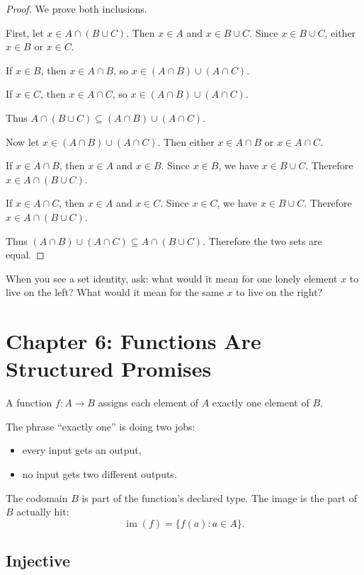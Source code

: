 \documentclass[11pt]{article}
\begin{document}
\begin{proof}
We prove both inclusions.

First, let $x\in A\cap(B\cup C)$. Then $x\in A$ and $x\in B\cup C$. Since $x\in B\cup C$, either $x\in B$ or $x\in C$.

If $x\in B$, then $x\in A\cap B$, so $x\in (A\cap B)\cup(A\cap C)$.

If $x\in C$, then $x\in A\cap C$, so $x\in (A\cap B)\cup(A\cap C)$.

Thus $A\cap(B\cup C)\subseteq (A\cap B)\cup(A\cap C)$.

Now let $x\in (A\cap B)\cup(A\cap C)$. Then either $x\in A\cap B$ or $x\in A\cap C$.

If $x\in A\cap B$, then $x\in A$ and $x\in B$. Since $x\in B$, we have $x\in B\cup C$. Therefore $x\in A\cap(B\cup C)$.

If $x\in A\cap C$, then $x\in A$ and $x\in C$. Since $x\in C$, we have $x\in B\cup C$. Therefore $x\in A\cap(B\cup C)$.

Thus $(A\cap B)\cup(A\cap C)\subseteq A\cap(B\cup C)$. Therefore the two sets are equal.
\end{proof}

\begin{walkbox}
When you see a set identity, ask: what would it mean for one lonely element $x$ to live on the left? What would it mean for the same $x$ to live on the right?
\end{walkbox}

\section{Chapter 6: Functions Are Structured Promises}

A function $f:A\to B$ assigns each element of $A$ exactly one element of $B$.

The phrase ``exactly one'' is doing two jobs:

\begin{itemize}
\item every input gets an output,
\item no input gets two different outputs.
\end{itemize}

The codomain $B$ is part of the function's declared type. The image is the part of $B$ actually hit:
\[
\operatorname{im}(f)=\{f(a):a\in A\}.
\]

\subsection{Injective}
\end{document}
